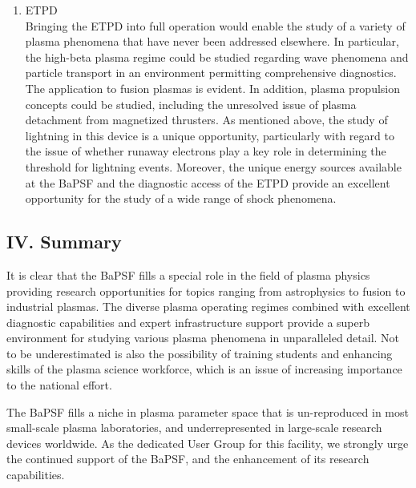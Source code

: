 \documentclass[11pt]{article}
\begin{document}
\begin{enumerate}
\item ETPD\\
Bringing the ETPD into full operation would enable the study of a variety of plasma
phenomena that have never been addressed elsewhere. In particular, the high-beta
plasma regime could be studied regarding wave phenomena and particle transport in an
environment permitting comprehensive diagnostics. The application to fusion plasmas
is evident. In addition, plasma propulsion concepts could be studied, including the
unresolved issue of plasma detachment from magnetized thrusters. As mentioned above,
the study of lightning in this device is a unique opportunity, particularly with regard to
the issue of whether runaway electrons play a key role in determining the threshold for
lightning events. Moreover, the unique energy sources available at the BaPSF and the
diagnostic access of the ETPD provide an excellent opportunity for the study of a wide
range of shock phenomena.
\end{enumerate}

\subsection{IV. Summary}
It is clear that the BaPSF fills a special role in the field of plasma physics providing
research opportunities for topics ranging from astrophysics to fusion to industrial
plasmas. The diverse plasma operating regimes combined with excellent diagnostic
capabilities and expert infrastructure support provide a superb environment for studying
various plasma phenomena in unparalleled detail. Not to be underestimated is also the
possibility of training students and enhancing skills of the plasma science workforce,
which is an issue of increasing importance to the national effort.

The BaPSF fills a niche in plasma parameter space that is un-reproduced in most small-scale
plasma laboratories, and underrepresented in large-scale research devices
worldwide. As the dedicated User Group for this facility, we strongly urge the continued
support of the BaPSF, and the enhancement of its research capabilities.
\end{document}
